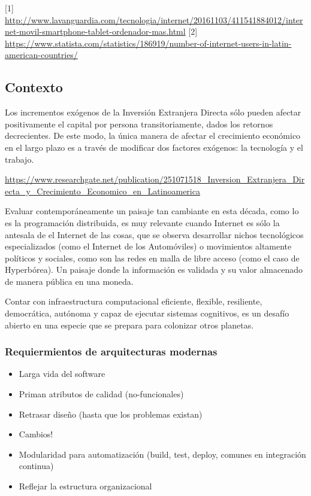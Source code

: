 [1] \url{http://www.lavanguardia.com/tecnologia/internet/20161103/411541884012/internet-movil-smartphone-tablet-ordenador-mas.html}
[2] \url{https://www.statista.com/statistics/186919/number-of-internet-users-in-latin-american-countries/}

\subsection{Contexto} %
\label{sub:contexto}


Los incrementos exógenos de la Inversión Extranjera Directa sólo pueden afectar positivamente el capital por persona transitoriamente, dados los retornos decrecientes. De este modo, la única manera de afectar el crecimiento económico en el largo plazo es a través de modificar dos factores exógenos: la tecnología y el trabajo.

\url{https://www.researchgate.net/publication/251071518_Inversion_Extranjera_Directa_y_Crecimiento_Economico_en_Latinoamerica}

Evaluar contemporáneamente un paisaje tan cambiante en esta década, como lo es la programación distribuida, es muy relevante cuando Internet es sólo la antesala de el Internet de las cosas, que se observa desarrollar nichos tecnológicos especializados (como el Internet de los Automóviles) o movimientos altamente políticos y sociales, como son las redes en malla de libre acceso (como el caso de Hyperbórea). Un paisaje donde la información es validada y su valor almacenado de manera pública en una moneda.


Contar con infraestructura computacional eficiente, flexible, resiliente, democrática, autónoma y capaz de ejecutar sistemas cognitivos, es un desafío abierto en una especie que se prepara para colonizar otros planetas.

\subsubsection{Requiermientos de arquitecturas modernas}  
  \begin{itemize}
    \item Larga vida del software
    \item Priman atributos de calidad (no-funcionales)
    \item Retrasar diseño (hasta que los problemas existan)
    \item Cambios!
    \item Modularidad para automatización (build, test, deploy, comunes en integración continua)
    \item Reflejar la estructura organizacional
  \end{itemize}

